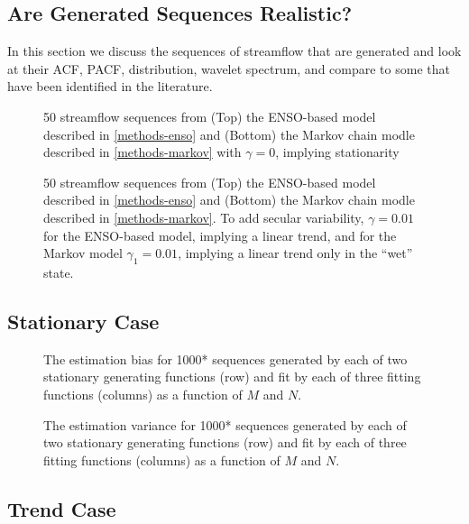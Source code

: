 \documentclass[12pt]{article}
\begin{document}
\subsection{Are Generated Sequences Realistic?\label{sec:sequence-realistic}}

In this section we discuss the sequences of streamflow that are generated and look at their ACF, PACF, distribution, wavelet spectrum, \etc{} and compare to some that have been identified in the literature.

\begin{figure}[ht]
  \caption{50 streamflow sequences from (Top) the ENSO-based model described in \cref{methods-enso} and (Bottom) the Markov chain modle described in \cref{methods-markov} with \(\gamma=0\), implying stationarity\label{fig:stationary-sequences}}
\end{figure}

\begin{figure}[ht]
  \caption{50 streamflow sequences from (Top) the ENSO-based model described in \cref{methods-enso} and (Bottom) the Markov chain modle described in \cref{methods-markov}. To add secular variability, \(\gamma=0.01\) for the ENSO-based model, implying a linear trend, and for the Markov model \(\gamma_1 = 0.01\), implying a linear trend only in the ``wet'' state.\label{fig:trend-sequences}}
\end{figure}

\subsection{Stationary Case}

\begin{figure}[ht]
  \caption{The estimation bias for 1000* sequences generated by each of two stationary generating functions (row) and fit by each of three fitting functions (columns) as a function of \(M\) and \(N\).\label{fig:stationary-bias}}
\end{figure}

\begin{figure}[ht]
  \caption{The estimation variance for 1000* sequences generated by each of two stationary generating functions (row) and fit by each of three fitting functions (columns) as a function of \(M\) and \(N\).\label{fig:stationary-bias}}
\end{figure}


\subsection{Trend Case}
\end{document}
